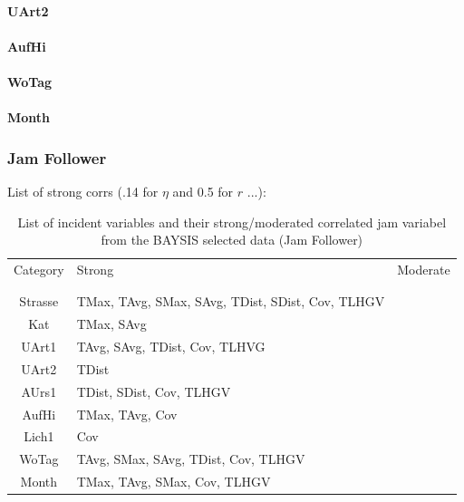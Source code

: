 \documentclass[a4paper,headsepline,footsepline,fontsize=11pt,BCOR=12mm,DIV=12]{report}
\begin{document}
\paragraph{UArt2}

\paragraph{AufHi}

\paragraph{WoTag}

\paragraph{Month}

\subsubsection{Jam Follower}

List of strong corrs (.14 for $\eta$ and 0.5 for $r$ ...):

\noindent
\begin{table}[h!]
	\centering
	\begin{tabular}{c|l|l}  
		Category & Strong & Moderate \\
		\\[-1em]
		\hline
		\\[-1em]
		Strasse & TMax, TAvg, SMax, SAvg, TDist, SDist, Cov, TLHGV & \\ 
 		Kat & TMax, SAvg & \\ 
 		UArt1 & TAvg, SAvg, TDist, Cov, TLHVG & \\
 		UArt2 & TDist & \\
 		AUrs1 & TDist, SDist, Cov, TLHGV & \\
 		AufHi & TMax, TAvg, Cov & \\
 		Lich1 & Cov & \\
 		WoTag & TAvg, SMax, SAvg, TDist, Cov, TLHGV & \\
 		Month & TMax, TAvg, SMax, Cov, TLHGV & \\
	\end{tabular}
	\caption{List of incident variables and their strong/moderated correlated jam variabel from the BAYSIS selected data (Jam Follower)}
\end{table}
\end{document}
